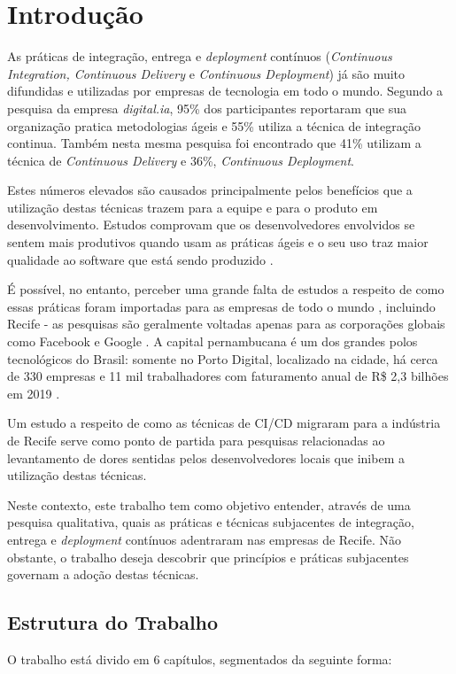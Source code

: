 
\chapter{Introdução}

As práticas de integração, entrega e \emph{deployment} contínuos (\emph{Continuous Integration, Continuous Delivery} e \emph{Continuous Deployment}) já são muito difundidas e utilizadas por empresas de tecnologia em todo o mundo. Segundo a pesquisa da empresa \emph{digital.ia}\cite{stateAgileReport2020}, 95\% dos participantes reportaram que sua organização pratica metodologias ágeis e 55\% utiliza a técnica de integração continua. Também nesta mesma pesquisa foi encontrado que 41\% utilizam a técnica de \emph{Continuous Delivery} e 36\%, \emph{Continuous Deployment}.

Estes números elevados são causados principalmente pelos benefícios que a utilização destas técnicas trazem para a equipe e para o produto em desenvolvimento. Estudos comprovam que os desenvolvedores envolvidos se sentem mais produtivos quando usam as práticas ágeis \cite{hilton2016} e o seu uso traz maior qualidade ao software que está sendo produzido \cite{savor2015}. 

É possível, no entanto, perceber uma grande falta de estudos a respeito de como essas práticas foram importadas para as empresas de todo o mundo \cite{empiricalStudy2016}, incluindo Recife - as pesquisas são geralmente voltadas apenas para as corporações globais como Facebook \cite{savor2015} e Google \cite{googleCi}. A capital pernambucana é um dos grandes polos tecnológicos do Brasil: somente no Porto Digital, localizado na cidade, há cerca de 330 empresas e 11 mil trabalhadores com faturamento anual de R\$ 2,3 bilhões em 2019 \cite{portoDigital}.

Um estudo a respeito de como as técnicas de CI/CD migraram para a indústria de Recife serve como ponto de partida para pesquisas relacionadas ao levantamento de dores sentidas pelos desenvolvedores locais que inibem a utilização destas técnicas.

Neste contexto, este trabalho tem como objetivo entender, através de uma pesquisa qualitativa, quais as práticas e técnicas subjacentes de integração, entrega e \emph{deployment} contínuos adentraram nas empresas de Recife. Não obstante, o trabalho deseja descobrir que princípios e práticas subjacentes governam a adoção destas técnicas.

\section{Estrutura do Trabalho}
 O trabalho está divido em 6 capítulos, segmentados da seguinte forma:

